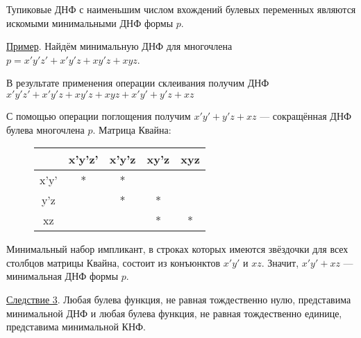 Тупиковые ДНФ с наименьшим числом вхождений булевых переменных являются искомыми минимальными ДНФ формы $p$.

\underline{Пример}. Найдём минимальную ДНФ для многочлена $p=x'y'z'+x'y'z+xy'z+xyz$.

В результате применения операции склеивания получим ДНФ $x'y'z' + x'y'z + xy'z + xyz + x'y' + y'z + xz$

С помощью операции поглощения получим $x'y'+y'z + xz$ --- сокращённая ДНФ булева многочлена $p$. Матрица Квайна:
\begin{figure}[H]
    \centering
    \begin{tabular}{|c|c|c|c|c|}
        \hline
        ~    & x'y'z' & x'y'z & xy'z & xyz \\
        \hline
        x'y' &   *    &   *   &   ~  &  ~ \\
        \hline
        y'z  &   ~    &   *   &   *  &  ~ \\
        \hline
        xz   &   ~    &   ~   &   *  &  *  \\
        \hline
    \end{tabular}
\end{figure}
Минимальный набор импликант, в строках которых имеются звёздочки для всех столбцов матрицы Квайна, состоит из конъюнктов $x'y'$ и $xz$. Значит, $x'y' + xz$ --- минимальная ДНФ формы $p$.

\underline{Следствие 3}. Любая булева функция, не равная тождественно нулю, представима минимальной ДНФ и любая булева функция, не равная тождественно единице, представима минимальной КНФ.

